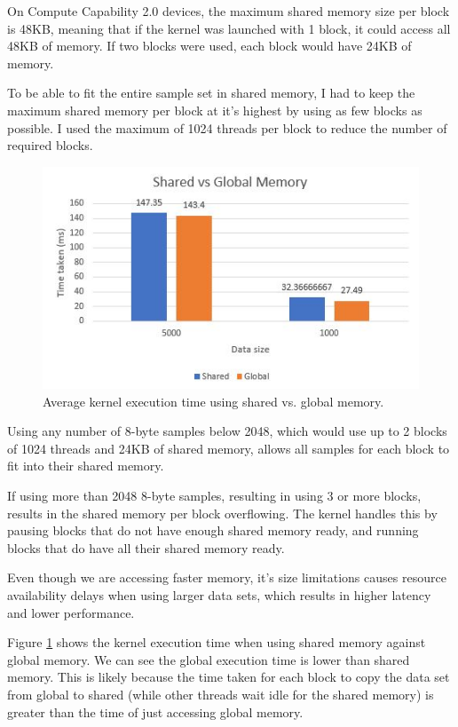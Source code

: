 \documentclass[11pt,a4paper]{article}
\begin{document}
On Compute Capability 2.0 devices, the maximum shared memory size per block is 48KB, meaning that if the kernel was launched with 1 block, it could access all 48KB of memory. If two blocks were used, each block would have 24KB of memory. 

To be able to fit the entire sample set in shared memory, I had to keep the maximum shared memory per block at it's highest by using as few blocks as possible. I used the maximum of 1024 threads per block to reduce the number of required blocks.  

\begin{figure}
\begin{center}
\includegraphics[scale=0.6]{shared_vs_global_graph}
\end{center}
\caption{Average kernel execution time using shared vs. global memory.}
\label{fig:shared_vs_global_graph}
\end{figure}

Using any number of 8-byte samples below 2048, which would use up to 2 blocks of 1024 threads and 24KB of shared memory, allows all samples for each block to fit into their shared memory. 

If using more than 2048 8-byte samples, resulting in using 3 or more blocks, results in the shared memory per block overflowing. The kernel handles this by pausing blocks that do not have enough shared memory ready, and running blocks that do have all their shared memory ready.

Even though we are accessing faster memory, it's size limitations causes resource availability delays when using larger data sets, which results in higher latency and lower performance. 

Figure \ref{fig:shared_vs_global_graph} shows the kernel execution time when using shared memory against global memory. We can see the global execution time is lower than shared memory. This is likely because the time taken for each block to copy the data set from global to shared (while other threads wait idle for the shared memory) is greater than the time of just accessing global memory.
\end{document}
